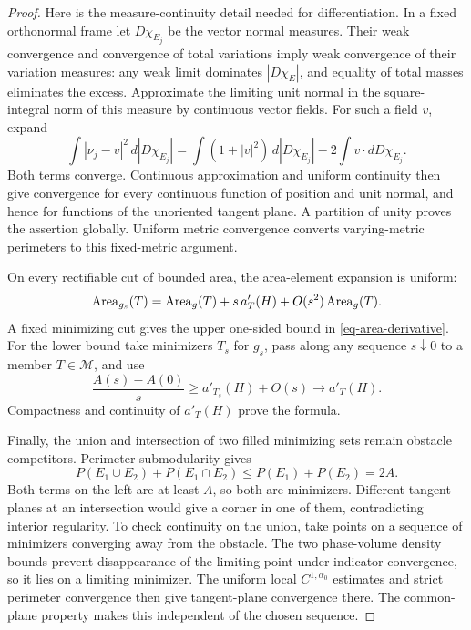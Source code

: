 \begin{proof}
Here is the measure-continuity detail needed for differentiation.
In a fixed orthonormal frame let \(D\chi_{E_j}\) be the vector normal
measures.  Their weak convergence and convergence of total variations
imply weak convergence of their variation measures: any weak limit
dominates \(|D\chi_E|\), and equality of total masses eliminates the
excess.  Approximate the limiting unit normal in the square-integral
norm of this measure by continuous vector fields.  For such a field
\(v\), expand
\[
 \int|\nu_j-v|^2\,d|D\chi_{E_j}|
 =\int(1+|v|^2)\,d|D\chi_{E_j}|
       -2\int v\cdot dD\chi_{E_j}.
\]
Both terms converge.  Continuous approximation and uniform continuity
then give convergence for every continuous function of position and
unit normal, and hence for functions of the unoriented tangent plane.
A partition of unity proves the assertion globally.  Uniform metric
convergence converts varying-metric perimeters to this fixed-metric
argument.

On every rectifiable cut of bounded area, the area-element expansion is
uniform:
\begin{equation}
 \operatorname{Area}_{g_s}(T)=\operatorname{Area}_g(T)+s\,a'_T(H)
                      +O(s^2)\operatorname{Area}_g(T).
 \label{eq-area-taylor}
\end{equation}
A fixed minimizing cut gives the upper one-sided bound in
\eqref{eq-area-derivative}.  For the lower bound take minimizers \(T_s\)
for \(g_s\), pass along any sequence \(s\downarrow0\) to a member
\(T\in\mathcal M\), and use
\[
 \frac{A(s)-A(0)}s
   \geq a'_{T_s}(H)+O(s)\longrightarrow a'_T(H).
\]
Compactness and continuity of \(a'_T(H)\) prove the formula.

Finally, the union and intersection of two filled minimizing sets
remain obstacle competitors.  Perimeter submodularity gives
\[
 P(E_1\cup E_2)+P(E_1\cap E_2)
       \leq P(E_1)+P(E_2)=2A.
\]
Both terms on the left are at least \(A\), so both are minimizers.
Different tangent planes at an intersection would give a corner in
one of them, contradicting interior regularity.  To check continuity
on the union, take points on a sequence of minimizers converging away
from the obstacle.  The two phase-volume density bounds prevent disappearance of the
limiting point under indicator convergence, so it lies on a limiting
minimizer. The uniform local \(C^{1,\alpha_0}\) estimates and strict
perimeter convergence then give tangent-plane convergence there.  The
common-plane property makes this independent of the chosen sequence.
\end{proof}

